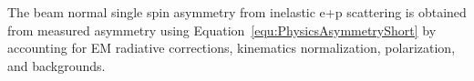 %
%
%	
%
%
%	
%
%	
%	
%	
%
%
%
%
The beam normal single spin asymmetry from inelastic e+p scattering is obtained from measured asymmetry using Equation~\ref{equ:PhysicsAsymmetryShort} by accounting for EM radiative corrections, kinematics normalization, polarization, and backgrounds.

